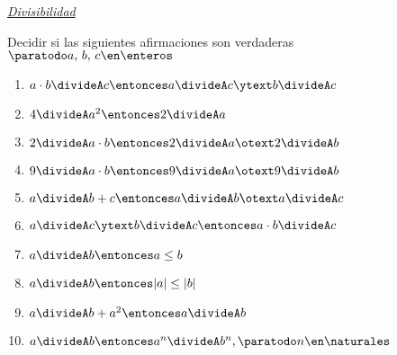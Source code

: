 \textit{\underline{Divisibilidad}}\par

\begin{enunciado}{\ejercicio}
  Decidir si las siguientes afirmaciones son verdaderas
  $\paratodo a,\, b,\, c \en \enteros$
  \begin{multicols}{2}
    \begin{enumerate}[label=\alph*)]
      \item $a \cdot b \divideA c \entonces a \divideA c  \ytext  b \divideA c$
      \item $4 \divideA a^2 \entonces 2 \divideA a $
      \item $2 \divideA a \cdot b \entonces 2 \divideA a  \otext 2 \divideA b$
      \item $9 \divideA a\cdot b \entonces 9 \divideA a   \otext  9 \divideA b$
      \item $a \divideA b + c \entonces a \divideA b  \otext  a \divideA c$
      \item $a \divideA c \ytext b \divideA c \entonces a \cdot b \divideA c$
      \item $a \divideA b \entonces a \leq b$
      \item $a \divideA b \entonces |a| \leq |b|$
      \item $a \divideA b + a^2 \entonces a \divideA b$
      \item $a \divideA b \entonces a^n \divideA b^n, \paratodo n \en \naturales$
    \end{enumerate}
  \end{multicols}
\end{enunciado}

